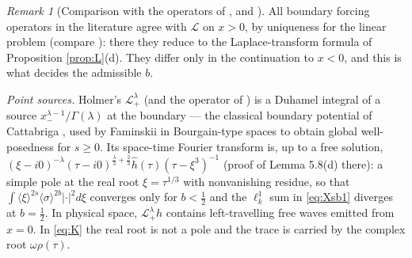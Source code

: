\documentclass[10pt,reqno]{amsart}
\theoremstyle{remark}
\newtheorem{remark}[theorem]{Remark}
\numberwithin{equation}{section}
\newcommand{\om}{\omega}
\newcommand{\la}{\lambda}
\newcommand{\lan}{\langle}
\newcommand{\ran}{\rangle}
\newcommand{\Lc}{\mathcal{L}}
\newcommand{\sig}{\sigma}
\begin{document}
\begin{remark}[Comparison with the operators of \cite{CK,Holmer}, \cite{BSZ2} and \cite{ET,HY,CT,GK}]\label{rem:holmer}
All boundary forcing operators in the literature agree with $\Lc$ on $x>0$, by uniqueness for the linear problem (compare \cite[Lemma 8.1]{Holmer}): there they reduce to the Laplace-transform formula of Proposition \ref{prop:L}(d). They differ only in the continuation to $x<0$, and this is what decides the admissible $b$.

\emph{Point sources.} Holmer's $\Lc^\la_+$ \cite[Section 3]{Holmer} (and the operator of \cite{CK}) is a Duhamel integral of a source $x_-^{\la-1}/\Gamma(\la)$ at the boundary --- the classical boundary potential of Cattabriga \cite{Cat}, used by Faminskii \cite{Fa2} in Bourgain-type spaces to obtain global well-posedness for $s\ge0$. Its space-time Fourier transform is, up to a free solution, $(\xi-i0)^{-\la}(\tau-i0)^{\frac\la3+\frac23}\widehat h(\tau)(\tau-\xi^3)^{-1}$ (proof of Lemma 5.8(d) there): a simple pole at the real root $\xi=\tau^{1/3}$ with nonvanishing residue, so that $\int\lan\xi\ran^{2s}\lan\sig\ran^{2b}|\cdot|^2d\xi$ converges only for $b<\frac12$ and the $\ell^1_k$ sum in \eqref{eq:Xsb1} diverges at $b=\frac12$. In physical space, $\Lc^\la_+h$ contains left-travelling free waves emitted from $x=0$. In \eqref{eq:K} the real root is not a pole and the trace is carried by the complex root $\om\rho(\tau)$.


\end{remark}
\end{document}
